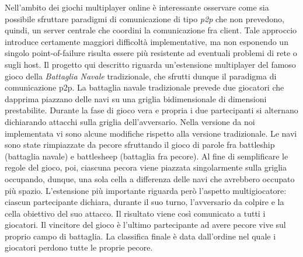 Nell'ambito dei giochi multiplayer online è interessante osservare come sia 
possibile sfruttare paradigmi di comunicazione di tipo \textit{p2p} che non
prevedono, quindi, un server centrale che coordini la comunicazione fra client.
Tale approccio introduce certamente maggiori difficoltà implementative, ma
non esponendo un singolo point-of-failure risulta essere più resistente ad
eventuali problemi di rete o sugli host.\newline
Il progetto qui descritto riguarda un'estensione multiplayer del famoso gioco
della \textit{Battaglia Navale} tradizionale, che sfrutti dunque il paradigma di
comunicazione p2p.\newline
La battaglia navale tradizionale prevede due giocatori che dapprima piazzano 
delle navi su una griglia bidimensionale di dimensioni prestabilite. Durante la 
fase di gioco vera e propria i due partecipanti si alternano dichiarando 
attacchi sulla griglia dell'avversario.\newline
Nella versione da noi implementata vi sono alcune modifiche rispetto alla 
versione tradizionale. Le navi sono state rimpiazzate da pecore sfruttando il 
gioco di parole fra battleship (battaglia navale) e battlesheep (battaglia fra
pecore). Al fine di semplificare le regole del gioco, poi, ciascuna pecora viene
piazzata singolarmente sulla griglia occupando, dunque, una sola cella a
differenza delle navi che avrebbero occupato più spazio.\newline
L'estensione più importante riguarda però l'aspetto multigiocatore: ciascun 
partecipante dichiara, durante il suo turno, l'avversario da colpire e la 
cella obiettivo del suo attacco. Il risultato viene così comunicato a tutti i 
giocatori. Il vincitore del gioco è l'ultimo partecipante ad avere pecore vive 
sul proprio campo di battaglia. La classifica finale è data dall'ordine nel 
quale i giocatori perdono tutte le proprie pecore.
